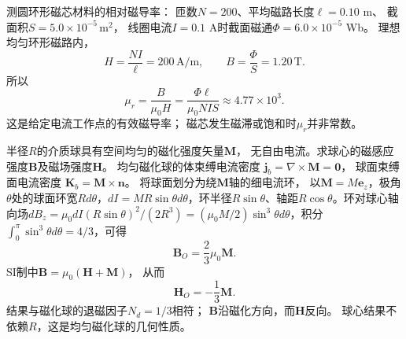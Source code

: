\problemtext 测圆环形磁芯材料的相对磁导率：
匝数$N=200$、平均磁路长度$\ell=0.10$ m、
截面积$S=5.0\times10^{-5}\,\mathrm{m^2}$，
线圈电流$I=0.1$ A时截面磁通$\Phi=6.0\times10^{-5}$ Wb。
\workings
理想均匀环形磁路内，
\[
H=\frac{NI}{\ell}=200\,\mathrm{A/m},\qquad
B=\frac{\Phi}{S}=1.20\,\mathrm T.
\]
所以
\[
\boxed{\mu_r=\frac{B}{\mu_0H}
=\frac{\Phi\ell}{\mu_0NIS}
\approx4.77\times10^3}.
\]
\crosscheck 这是给定电流工作点的有效磁导率；
磁芯发生磁滞或饱和时$\mu_r$并非常数。

\problemtext 半径$R$的介质球具有空间均匀的磁化强度矢量$\bm M$，
无自由电流。求球心的磁感应强度$\bm B$及磁场强度$\bm H$。
\workings
均匀磁化球的体束缚电流密度
$\bm j_b=\nabla\times\bm M=\bm0$，
球面束缚面电流密度
$\bm K_b=\bm M\times\bm n$。
将球面划分为绕$\bm M$轴的细电流环，
以$\bm M=M\bm e_z$，极角$\theta$处的球面环宽$R d\theta$，$dI=MR\sin\theta d\theta$，环半径$R\sin\theta$、轴距$R\cos\theta$。环对球心轴向场$dB_z=\mu_0 dI(R\sin\theta)^2/(2R^3)=(\mu_0M/2)\sin^3\theta d\theta$，积分$\int_0^\pi\sin^3\theta d\theta=4/3$，可得
\[
\boxed{\bm B_O=\frac23\mu_0\bm M}.
\]
SI制中$\bm B=\mu_0(\bm H+\bm M)$，
从而
\[
\boxed{\bm H_O=-\frac13\bm M}.
\]
\crosscheck 结果与磁化球的退磁因子$N_d=1/3$相符；
$\bm B$沿磁化方向，而$\bm H$反向。
球心结果不依赖$R$，这是均匀磁化球的几何性质。
